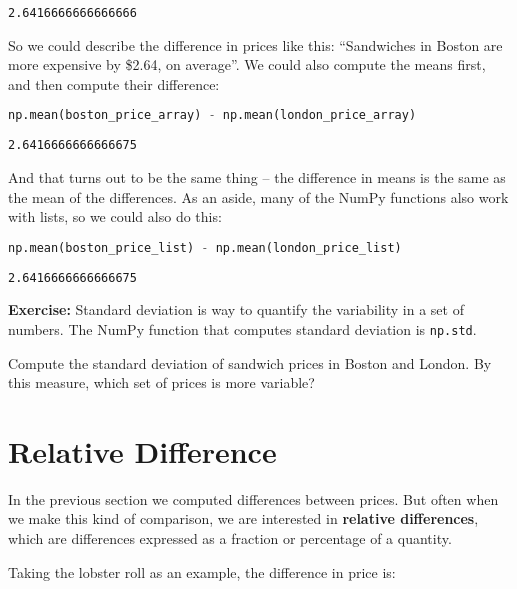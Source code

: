 \begin{lstlisting}[style=output]
2.6416666666666666
\end{lstlisting}

So we could describe the difference in prices like this: ``Sandwiches in
Boston are more expensive by \$2.64, on average''. We could also compute
the means first, and then compute their difference:

\begin{lstlisting}[language=Python,style=source]
np.mean(boston_price_array) - np.mean(london_price_array)
\end{lstlisting}

\begin{lstlisting}[style=output]
2.6416666666666675
\end{lstlisting}

And that turns out to be the same thing -- the difference in means is
the same as the mean of the differences. As an aside, many of the NumPy
functions also work with lists, so we could also do this:

\begin{lstlisting}[language=Python,style=source]
np.mean(boston_price_list) - np.mean(london_price_list)
\end{lstlisting}

\begin{lstlisting}[style=output]
2.6416666666666675
\end{lstlisting}

\textbf{Exercise:} Standard deviation is way to quantify the variability
in a set of numbers. The NumPy function that computes standard deviation
is \passthrough{\lstinline!np.std!}.

Compute the standard deviation of sandwich prices in Boston and London.
By this measure, which set of prices is more variable?

\hypertarget{relative-difference}{%
\section{Relative Difference}\label{relative-difference}}

In the previous section we computed differences between prices. But
often when we make this kind of comparison, we are interested in
\textbf{relative differences}, which are differences expressed as a
fraction or percentage of a quantity.

Taking the lobster roll as an example, the difference in price is:

